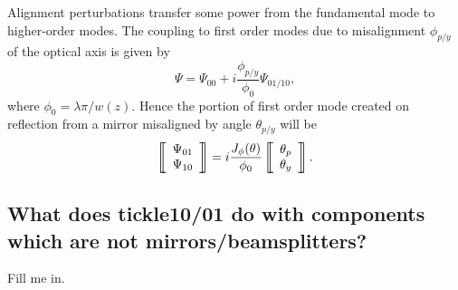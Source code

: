 \documentclass[12pt]{article}
\begin{document}
Alignment perturbations transfer some power from the fundamental mode
to higher-order modes. The coupling to first order modes due to
misalignment $\phi_{p/y}$ of the optical axis is given by
\begin{equation}
  \Psi = \Psi_{00}+i\frac{\phi_{p/y}}{\phi_0}\Psi_{01/10},
\end{equation}
where $\phi_0 = \lambda\pi/w(z)$. Hence the portion of first order
mode created on reflection from a mirror misaligned by angle $\theta_{p/y}$
will be
\begin{equation}
\matrixBegin{c}
\Psi_{01} \\
\Psi_{10}
\matrixEnd=i\frac{ J_\phi(\theta)}{\phi_0}
\matrixBegin{c}
\theta_p \\
\theta_y
\matrixEnd.
\end{equation}



\subsection{What does tickle10/01 do with components which are not
  mirrors/beamsplitters?}

Fill me in.
\end{document}
